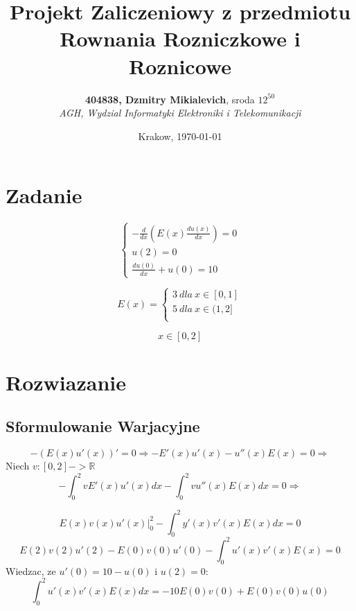 \documentclass{article}
\title{Projekt Zaliczeniowy z przedmiotu Rownania Rozniczkowe i Roznicowe}
\author{\textbf{404838, Dzmitry Mikialevich}, sroda $12^{50}$\\
\textit{AGH, Wydzial Informatyki Elektroniki i Telekomunikacji}\\
\date{Krakow, \today}
}
\begin{document}

\maketitle
\tableofcontents
\newenvironment{centerfig}
{\begin{figure}[H]\centering}
{\end{figure}}
\newpage

\section{Zadanie}

\begin{equation*}
 \begin{cases}
   - \frac{d}{dx}(E(x)\frac{du(x)}{dx}) = 0 \\
   u(2) = 0 \\
   \frac{du(0)}{dx} + u(0) = 10
 \end{cases}
\end{equation*}


\begin{equation*}
  E(x) = 
  \begin{cases}
    3\: dla\: x \in [0,1] \\
    5\: dla\: x \in  (1,2]\\
  \end{cases}
 \end{equation*}

 \begin{equation*}
x \in [0,2]
 \end{equation*}


\section{Rozwiazanie}

\subsection{Sformulowanie Warjacyjne}


\[-(E(x)u'(x))' = 0 \Rightarrow -E'(x)u'(x) - u''(x)E(x)=0  \Rightarrow\]
Niech \(v: [0,2] -> \mathbb{R}\)
\[-\int_0^2{vE'(x)u'(x)dx} - \int_0^2{vu''(x)E(x)dx} = 0\Rightarrow\]
      
 \[E(x)v(x)u'(x) |_0^2 -  \int_0^2{y'(x)v'(x)E(x)dx}=0\]
\[E(2)v(2)u'(2) - E(0)v(0)u'(0) - \int_0^2{u'(x)v'(x)E(x)} = 0 \]  
Wiedzac, ze \(u'(0) = 10-u(0)\) i \(u(2)=0\):
\[\int_0^2{u'(x)v'(x)E(x)dx} = -10 E(0)v(0) + E(0)v(0)u(0)\]
\end{document}

